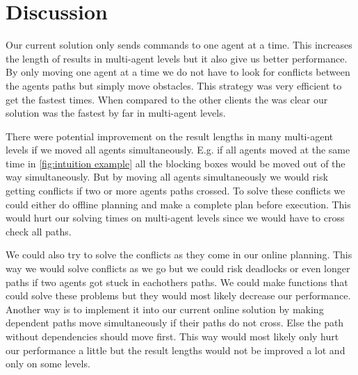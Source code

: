 \section{Discussion}
\label{sec:discussion}
Our current solution only sends commands to one agent at a time.
This increases the length of results in multi-agent levels but it also give us better performance.
By only moving one agent at a time we do not have to look for conflicts between the agents paths but simply move obstacles.
This strategy was very efficient to get the fastest times.
When compared to the other clients the was clear our solution was the fastest by far in multi-agent levels.

There were potential improvement on the result lengths in many multi-agent levels if we moved all agents simultaneously.
E.g. if all agents moved at the same time in \cref{fig:intuition example} all the blocking boxes would be moved out of the way simultaneously.
But by moving all agents simultaneously we would risk getting conflicts if two or more agents paths crossed.
To solve these conflicts we could either do offline planning and make a complete plan before execution.
This would hurt our solving times on multi-agent levels since we would have to cross check all paths.

We could also try to solve the conflicts as they come in our online planning.
This way we would solve conflicts as we go but we could risk deadlocks or even longer paths if two agents got stuck in eachothers paths.
We could make functions that could solve these problems but they would most likely decrease our performance.
Another way is to implement it into our current online solution by making dependent paths move simultaneously if their paths do not cross.
Else the path without dependencies should move first.
This way would most likely only hurt our performance a little but the result lengths would not be improved a lot and only on some levels.




